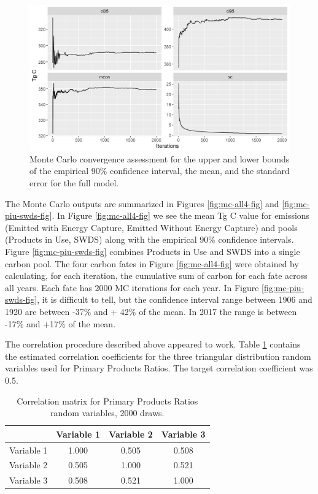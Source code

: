 \documentclass[
  openany]{book}
\begin{document}
\begin{figure}
\includegraphics[width=1\linewidth]{images/MC_conv} \caption{Monte Carlo convergence assessment for the upper and lower bounds of the empirical 90\% confidence interval, the mean, and the standard error for the full model.}\label{fig:mc-conv-fig}
\end{figure}

The Monte Carlo outputs are summarized in Figures \ref{fig:mc-all4-fig} and \ref{fig:mc-piu-swds-fig}. In Figure \ref{fig:mc-all4-fig} we see the mean Tg C value for emissions (Emitted with Energy Capture, Emitted Without Energy Capture) and pools (Products in Use, SWDS) along with the empirical 90\% confidence intervals. Figure \ref{fig:mc-piu-swds-fig} combines Products in Use and SWDS into a single carbon pool. The four carbon fates in Figure \ref{fig:mc-all4-fig} were obtained by calculating, for each iteration, the cumulative sum of carbon for each fate across all years. Each fate has 2000 MC iterations for each year. In Figure \ref{fig:mc-piu-swds-fig}, it is difficult to tell, but the confidence interval range between 1906 and 1920 are between -37\% and + 42\% of the mean. In 2017 the range is between -17\% and +17\% of the mean.

The correlation procedure described above appeared to work. Table \ref{tab:ppr-cor-tab} contains the estimated correlation coefficients for the three triangular distribution random variables used for Primary Products Ratios. The target correlation coefficient was 0.5.

\begin{table}

\caption{\label{tab:ppr-cor-tab}Correlation matrix for Primary Products Ratios random variables, 2000 draws.}
\centering
\begin{tabular}[t]{lccc}
\toprule
  & Variable 1 & Variable 2 & Variable 3\\
\midrule
Variable 1 & 1.000 & 0.505 & 0.508\\
Variable 2 & 0.505 & 1.000 & 0.521\\
Variable 3 & 0.508 & 0.521 & 1.000\\
\bottomrule
\end{tabular}
\end{table}
\end{document}
